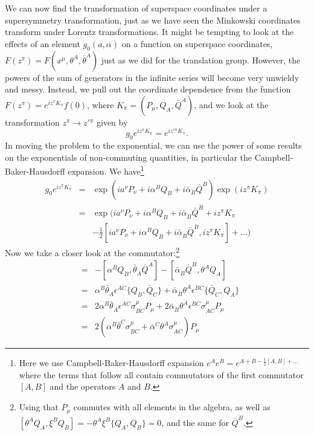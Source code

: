 \documentclass[notes.tex]{subfiles}
\begin{document}
We can now find the transformation of superspace coordinates under a supersymmetry transformation, just as we have seen the Minkowski coordinates transform under Lorentz transformations. It might be tempting to look at the effects of an element $g_0(a, \alpha)$ on a function on superspace coordinates, $F(z^\pi) = F(x^\mu, \theta^A, \bar{\theta}^{\dot{A}})$ just as we did for the translation group. However, the powers of the sum of generators in the infinite series will become very unwieldy and messy. Instead, we pull out the coordinate dependence from the function $F(z^\pi) = e^{iz^\pi K_\pi}f(0)$, where $K_\pi=(P_\mu,Q_A,\bar{Q}^{\dot{A}})$,  and we look at the transformation $z^\pi \to z'{}^\pi$ given by
\[g_0e^{iz^\pi K_\pi} = e^{iz'{}^\pi K_\pi}.\]
In moving the problem to the exponential, we can use the power of some results on the exponentials of non-commuting quantities, in particular the Campbell-Baker-Hausdorff expansion.
We have\footnote{Here we use Campbell-Baker-Hausdorff expansion $e^{A}e^{B} = e^{A + B - \frac{1}{2}[A, B] + ...}$ where the terms that follow all contain commutators of the first commutator  $[A, B] $ and the operators $A$ and $B$.}
\begin{eqnarray*}
g_0 e^{iz^\pi K_\pi} &=& \exp(ia^\nu P_\nu + i\alpha^BQ_B + i\bar{\alpha}_{\dot{B}}\bar{Q}^{\dot{B}})\exp( iz^\pi K_\pi)\\
&=& \exp(ia^\nu P_\nu + i\alpha^BQ_B + i\bar{\alpha}_{\dot{B}}\bar{Q}^{\dot{B}} + iz^\pi K_\pi\\
&& - \frac{1}{2}[ia^\nu P_\nu + i\alpha^BQ_B + i\bar{\alpha}_{\dot{B}}\bar{Q}^{\dot{B}}, iz^\pi K_\pi] + …)
\end{eqnarray*}
Now we take a closer look at the commutator:\footnote{Using that $P_\mu$ commutes with all elements in the  algebra, as well as $[\theta^A Q_A, \xi^B Q_B] = -\theta^A\xi^B\{Q_A, Q_B\} = 0$, and the same for $\bar{Q}^{\dot{B}}$.}
\begin{eqnarray*}
[~,~]&=&-[\alpha^BQ_B,\bar{\theta}_{\dot{A}}\bar{Q}^{\dot{A}}] - [\bar{\alpha}_{\dot{B}}\bar{Q}^{\dot{B}}, \theta^AQ_A]\\
&=&\alpha^B\bar{\theta}_{\dot{A}}\epsilon^{\dot{A}\dot{C}}\{Q_B,\bar{Q}_{\dot{C}}\} + \bar{\alpha}_{\dot{B}}\theta^A\epsilon^{\dot{B}\dot{C}}\{\bar{Q}_{\dot{C}}, Q_A\}\\
&=&2\alpha^B\bar{\theta}_{\dot{A}}\epsilon^{\dot{A}\dot{C}}\sigma^\mu_{B\dot{C}}P_\mu + 2\bar{\alpha}_{\dot{B}}\theta^A\epsilon^{\dot{B}\dot{C}}\sigma^\mu_{A\dot{C}}P_\mu\\
&=&2(\alpha^B\bar{\theta}^{\dot{C}}\sigma^\mu_{B\dot{C}} + \bar{\alpha}^{\dot{C}}\theta^A\sigma^\mu_{A\dot{C}})P_\mu
\end{eqnarray*}
\end{document}
